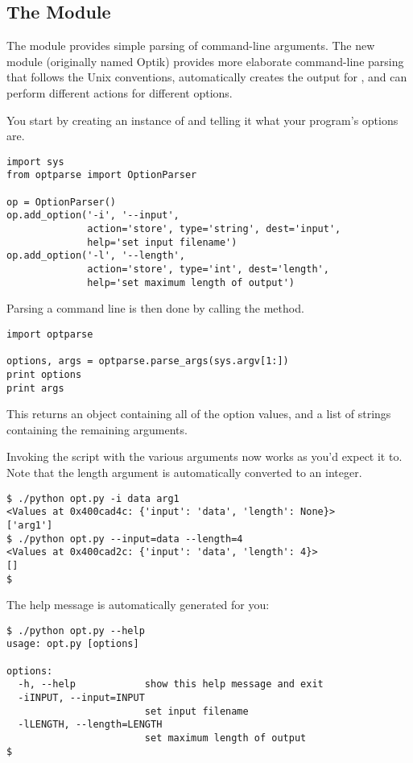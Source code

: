 \documentclass{howto}
\begin{document}
\subsection{The  Module}

The  module provides simple parsing of command-line
arguments.  The new  module (originally named Optik)
provides more elaborate command-line parsing that follows the Unix
conventions, automatically creates the output for ,
and can perform different actions for different options.

You start by creating an instance of  and telling
it what your program's options are.

\begin{verbatim}
import sys
from optparse import OptionParser

op = OptionParser()
op.add_option('-i', '--input',
              action='store', type='string', dest='input',
              help='set input filename')
op.add_option('-l', '--length',
              action='store', type='int', dest='length',
              help='set maximum length of output')
\end{verbatim}

Parsing a command line is then done by calling the 
method.

\begin{verbatim}
import optparse 

options, args = optparse.parse_args(sys.argv[1:])
print options
print args
\end{verbatim}

This returns an object containing all of the option values, 
and a list of strings containing the remaining arguments. 

Invoking the script with the various arguments now works as you'd
expect it to.  Note that the length argument is automatically
converted to an integer.

\begin{verbatim}
$ ./python opt.py -i data arg1
<Values at 0x400cad4c: {'input': 'data', 'length': None}>
['arg1']
$ ./python opt.py --input=data --length=4
<Values at 0x400cad2c: {'input': 'data', 'length': 4}>
[]
$
\end{verbatim}

The help message is automatically generated for you:

\begin{verbatim}
$ ./python opt.py --help
usage: opt.py [options]

options:
  -h, --help            show this help message and exit
  -iINPUT, --input=INPUT
                        set input filename
  -lLENGTH, --length=LENGTH
                        set maximum length of output
$ 
\end{verbatim}
\end{document}
